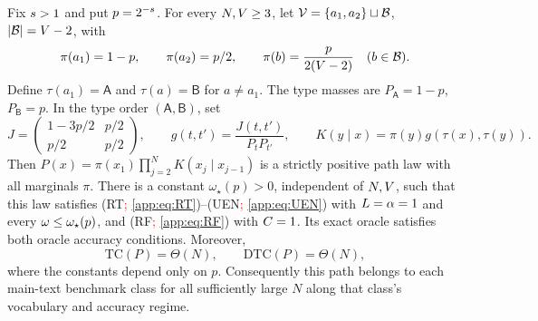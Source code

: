 \begin{proposition}
\label{app:prop:path-in-class}
Fix $s>1$ and put $p=2^{-s}$.
For every $N,V\ge3$, let
$\mathcal V=\{a_1,a_2\}\sqcup\mathcal B$, $|\mathcal B|=V-2$, with
\[
 \pi(a_1)=1-p,\qquad \pi(a_2)=p/2,\qquad
 \pi(b)=\frac{p}{2(V-2)}\quad(b\in\mathcal B).
\]
Define $\tau(a_1)=\mathsf A$ and $\tau(a)=\mathsf B$ for $a\ne a_1$.
The type masses are $P_{\mathsf A}=1-p$, $P_{\mathsf B}=p$.
In the type order $(\mathsf A,\mathsf B)$, set
\begin{equation}
 J=\begin{pmatrix}1-3p/2&p/2\\p/2&p/2\end{pmatrix},
 \qquad
 g(t,t')=\frac{J(t,t')}{P_tP_{t'}},\qquad
 K(y\mid x)=\pi(y)g(\tau(x),\tau(y)).
 \label{app:eq:two-type-kernel}
\end{equation}
Then $P(x)=\pi(x_1)\prod_{j=2}^NK(x_j\mid x_{j-1})$ is a strictly
positive path law with all marginals $\pi$.
There is a constant $\omega_\star(p)>0$, independent of $N,V$,
such that this law satisfies (RT\textcolor{red}{; \cref{app:eq:RT}})--(UEN\textcolor{red}{; \cref{app:eq:UEN}}) with
$L=\alpha=1$ and every
$\omega\le\omega_\star(p)$, and (RF\textcolor{red}{; \cref{app:eq:RF}}) with $C=1$.
Its exact oracle satisfies both oracle accuracy conditions.
Moreover,
\begin{equation}
 \mathrm{TC}(P)=\Theta(N),\qquad \mathrm{DTC}(P)=\Theta(N),
 \label{app:eq:path-tc-dtc}
\end{equation}
where the constants depend only on $p$.
Consequently this path belongs to each main-text benchmark class for all
sufficiently large $N$ along that class's vocabulary and accuracy regime.
\end{proposition}

